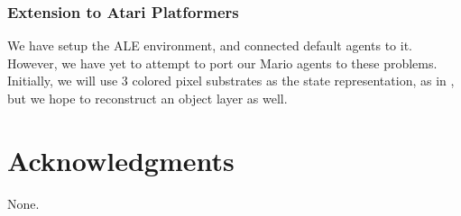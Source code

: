 \documentclass{article}
\begin{document}
\subsubsection{Extension to Atari Platformers}
We have setup the ALE environment, and connected default agents to it. However, we have yet to attempt to port our Mario agents to these problems. Initially, we will use 3 colored pixel substrates as the state representation, as in \cite{Hauskneck13}, but we hope to reconstruct an object layer as well.
 
\section*{Acknowledgments} 
 
None.



\end{document}
